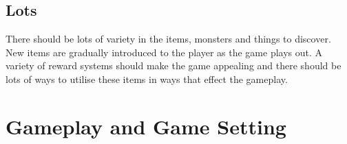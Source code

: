 \documentclass[a4paper]{scrreprt}
\begin{document}
\section{Lots}
There should be lots of variety in the items, monsters and things to discover.
New items are gradually introduced to the player as the game plays out.
A variety of reward systems should make the game appealing and there should be lots of ways to utilise these items in ways that effect the gameplay.



%
%
%
%



\chapter{Gameplay and Game Setting}
\end{document}

